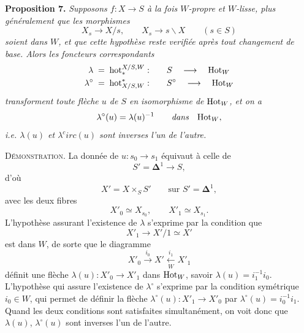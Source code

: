 \textbf{Proposition 7.} \textit{Supposons $f : X\longrightarrow S$ à la fois $W$-propre et $W$-lisse, plus généralement que les morphismes}
\[
X_s\longrightarrow X/s,\qquad X_s\longrightarrow s\backslash X\qquad(s\in S)
\]
\textit{soient dans $W$, et que cette hypothèse reste verifiée après tout changement de base. Alors les foncteurs correspondants} %
\[
\begin{aligned}
\lambda &\;=\;\mathrm{hot}_*^{X/S,W} : &&\quad S \quad\longrightarrow\quad \mathrm{Hot}_W\\
\lambda^\circ &\;=\;\mathrm{hot}^*_{X/S,W} : &&\quad S^\circ \quad\longrightarrow\quad \mathrm{Hot}_W
\end{aligned}
\]
\textit{transforment toute flèche $u$ de $S$ en} \textit{isomorphisme de} $\mathrm{Hot}_W$\textit{, et on a}
\[
\lambda^\circ(u)=\lambda(u)^{-1}\qquad\textit{dans}\quad\mathrm{Hot}_W,
\]
\textit{i.e. $\lambda(u)$ et $\lambda^c irc(u)$ sont inverses l'un de l'autre.} %

\textsc{Démonstration}. La donnée de $u : s_0\longrightarrow s_1$ équivaut à celle de
\[
S'=\mathbf{\Delta}^1\longrightarrow S,
\]
d'où
\[
X'=X\times_S S'\qquad\text{sur } S'=\mathbf{\Delta}^1,
\]
avec les deux fibres
\[
X'_0\simeq X_{s_0},\qquad X'_1\simeq X_{s_1}.
\]
L'hypothèse assurant l'existence de $\lambda$ s'exprime par la condition que
\[
X'_1\longrightarrow X'/1\simeq X'
\]
est dans $W$, de sorte que le diagramme
\[
X'_0\xrightarrow{i_0}X'\xleftarrow[W]{i_1}X'_1
\]
définit une flèche $\lambda(u) : X'_0\longrightarrow X'_1$ dans $\mathrm{Hot}_W$, savoir $\lambda(u)=i_1^{-1}i_0$. L'hypothèse qui assure l'existence de $\lambda^\circ$ s'exprime par la condition symétrique $i_0\in W$, qui permet de définir la flèche $\lambda^\circ(u) : X'_1\longrightarrow X'_0$ par $\lambda^\circ(u)=i_0^{-1}i_1$. Quand les deux conditions sont satisfaites simultanément, on voit donc que $\lambda(u)$, $\lambda^\circ(u)$ sont inverses l'un de l'autre.

